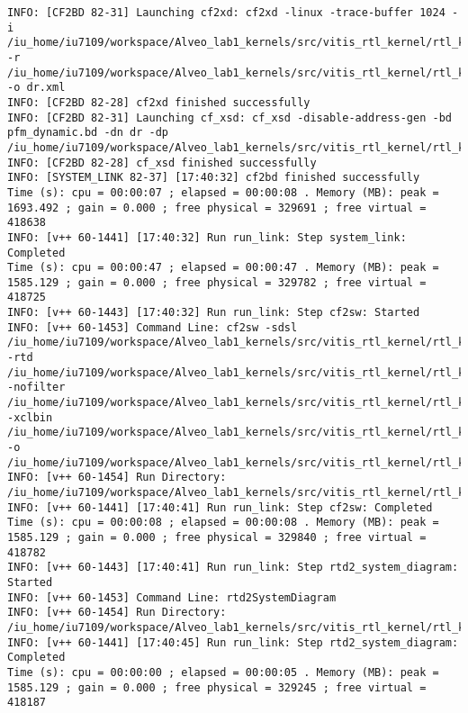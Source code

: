 \begin{center}
\begin{lstlisting}[label=lst:vlog,caption=Файл v++\_vinc.log]
INFO: [CF2BD 82-31] Launching cf2xd: cf2xd -linux -trace-buffer 1024 -i /iu_home/iu7109/workspace/Alveo_lab1_kernels/src/vitis_rtl_kernel/rtl_kernel_wizard_2/_x/link/sys_link/cfgraph/cfgen_cfgraph.xml -r /iu_home/iu7109/workspace/Alveo_lab1_kernels/src/vitis_rtl_kernel/rtl_kernel_wizard_2/_x/link/sys_link/_sysl/.cdb/xd_ip_db.xml -o dr.xml
INFO: [CF2BD 82-28] cf2xd finished successfully
INFO: [CF2BD 82-31] Launching cf_xsd: cf_xsd -disable-address-gen -bd pfm_dynamic.bd -dn dr -dp /iu_home/iu7109/workspace/Alveo_lab1_kernels/src/vitis_rtl_kernel/rtl_kernel_wizard_2/_x/link/sys_link/_sysl/.xsd
INFO: [CF2BD 82-28] cf_xsd finished successfully
INFO: [SYSTEM_LINK 82-37] [17:40:32] cf2bd finished successfully
Time (s): cpu = 00:00:07 ; elapsed = 00:00:08 . Memory (MB): peak = 1693.492 ; gain = 0.000 ; free physical = 329691 ; free virtual = 418638
INFO: [v++ 60-1441] [17:40:32] Run run_link: Step system_link: Completed
Time (s): cpu = 00:00:47 ; elapsed = 00:00:47 . Memory (MB): peak = 1585.129 ; gain = 0.000 ; free physical = 329782 ; free virtual = 418725
INFO: [v++ 60-1443] [17:40:32] Run run_link: Step cf2sw: Started
INFO: [v++ 60-1453] Command Line: cf2sw -sdsl /iu_home/iu7109/workspace/Alveo_lab1_kernels/src/vitis_rtl_kernel/rtl_kernel_wizard_2/_x/link/int/sdsl.dat -rtd /iu_home/iu7109/workspace/Alveo_lab1_kernels/src/vitis_rtl_kernel/rtl_kernel_wizard_2/_x/link/int/cf2sw.rtd -nofilter /iu_home/iu7109/workspace/Alveo_lab1_kernels/src/vitis_rtl_kernel/rtl_kernel_wizard_2/_x/link/int/cf2sw_full.rtd -xclbin /iu_home/iu7109/workspace/Alveo_lab1_kernels/src/vitis_rtl_kernel/rtl_kernel_wizard_2/_x/link/int/xclbin_orig.xml -o /iu_home/iu7109/workspace/Alveo_lab1_kernels/src/vitis_rtl_kernel/rtl_kernel_wizard_2/_x/link/int/xclbin_orig.1.xml
INFO: [v++ 60-1454] Run Directory: /iu_home/iu7109/workspace/Alveo_lab1_kernels/src/vitis_rtl_kernel/rtl_kernel_wizard_2/_x/link/run_link
INFO: [v++ 60-1441] [17:40:41] Run run_link: Step cf2sw: Completed
Time (s): cpu = 00:00:08 ; elapsed = 00:00:08 . Memory (MB): peak = 1585.129 ; gain = 0.000 ; free physical = 329840 ; free virtual = 418782
INFO: [v++ 60-1443] [17:40:41] Run run_link: Step rtd2_system_diagram: Started
INFO: [v++ 60-1453] Command Line: rtd2SystemDiagram
INFO: [v++ 60-1454] Run Directory: /iu_home/iu7109/workspace/Alveo_lab1_kernels/src/vitis_rtl_kernel/rtl_kernel_wizard_2/_x/link/run_link
INFO: [v++ 60-1441] [17:40:45] Run run_link: Step rtd2_system_diagram: Completed
Time (s): cpu = 00:00:00 ; elapsed = 00:00:05 . Memory (MB): peak = 1585.129 ; gain = 0.000 ; free physical = 329245 ; free virtual = 418187

\end{lstlisting}
\end{center}
